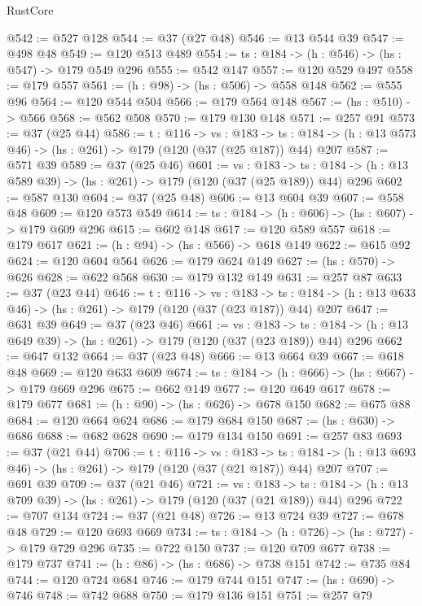 \begin{lexlean}{RustCore}
\begin{coremodule}
@542 := @527 @128
@544 := @37 (@27 @48)
@546 := @13 @544 @39
@547 := @498 @48
@549 := @120 @513 @489
@554 := {ts : @184} -> (h : @546) -> (hs : @547) -> @179 @549 @296
@555 := @542 @147
@557 := @120 @529 @497
@558 := @179 @557
@561 := (h : @98) -> (hs : @506) -> @558 @148
@562 := @555 @96
@564 := @120 @544 @504
@566 := @179 @564 @148
@567 := (hs : @510) -> @566
@568 := @562 @508
@570 := @179 @130 @148
@571 := @257 @91
@573 := @37 (@25 @44)
@586 := {t : @116} ->
  {vs : @183} ->
  {ts : @184} -> (h : @13 @573 @46) -> (hs : @261) -> @179 (@120 (@37 (@25 @187)) @44) @207
@587 := @571 @39
@589 := @37 (@25 @46)
@601 := {vs : @183} ->
  {ts : @184} -> (h : @13 @589 @39) -> (hs : @261) -> @179 (@120 (@37 (@25 @189)) @44) @296
@602 := @587 @130
@604 := @37 (@25 @48)
@606 := @13 @604 @39
@607 := @558 @48
@609 := @120 @573 @549
@614 := {ts : @184} -> (h : @606) -> (hs : @607) -> @179 @609 @296
@615 := @602 @148
@617 := @120 @589 @557
@618 := @179 @617
@621 := (h : @94) -> (hs : @566) -> @618 @149
@622 := @615 @92
@624 := @120 @604 @564
@626 := @179 @624 @149
@627 := (hs : @570) -> @626
@628 := @622 @568
@630 := @179 @132 @149
@631 := @257 @87
@633 := @37 (@23 @44)
@646 := {t : @116} ->
  {vs : @183} ->
  {ts : @184} -> (h : @13 @633 @46) -> (hs : @261) -> @179 (@120 (@37 (@23 @187)) @44) @207
@647 := @631 @39
@649 := @37 (@23 @46)
@661 := {vs : @183} ->
  {ts : @184} -> (h : @13 @649 @39) -> (hs : @261) -> @179 (@120 (@37 (@23 @189)) @44) @296
@662 := @647 @132
@664 := @37 (@23 @48)
@666 := @13 @664 @39
@667 := @618 @48
@669 := @120 @633 @609
@674 := {ts : @184} -> (h : @666) -> (hs : @667) -> @179 @669 @296
@675 := @662 @149
@677 := @120 @649 @617
@678 := @179 @677
@681 := (h : @90) -> (hs : @626) -> @678 @150
@682 := @675 @88
@684 := @120 @664 @624
@686 := @179 @684 @150
@687 := (hs : @630) -> @686
@688 := @682 @628
@690 := @179 @134 @150
@691 := @257 @83
@693 := @37 (@21 @44)
@706 := {t : @116} ->
  {vs : @183} ->
  {ts : @184} -> (h : @13 @693 @46) -> (hs : @261) -> @179 (@120 (@37 (@21 @187)) @44) @207
@707 := @691 @39
@709 := @37 (@21 @46)
@721 := {vs : @183} ->
  {ts : @184} -> (h : @13 @709 @39) -> (hs : @261) -> @179 (@120 (@37 (@21 @189)) @44) @296
@722 := @707 @134
@724 := @37 (@21 @48)
@726 := @13 @724 @39
@727 := @678 @48
@729 := @120 @693 @669
@734 := {ts : @184} -> (h : @726) -> (hs : @727) -> @179 @729 @296
@735 := @722 @150
@737 := @120 @709 @677
@738 := @179 @737
@741 := (h : @86) -> (hs : @686) -> @738 @151
@742 := @735 @84
@744 := @120 @724 @684
@746 := @179 @744 @151
@747 := (hs : @690) -> @746
@748 := @742 @688
@750 := @179 @136 @151
@751 := @257 @79

\end{coremodule}
\end{lexlean}
